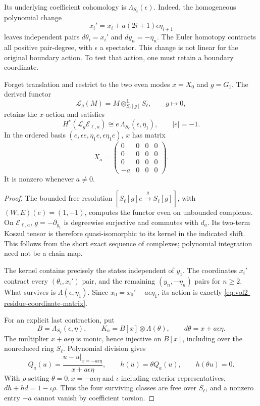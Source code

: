 Its underlying coefficient cohomology is
\(\Lambda_{S_\ell}(\epsilon)\). Indeed, the homogeneous
polynomial change
\[
 x_i'=x_i+a(2i+1)\epsilon\eta_{i+1}
\]
leaves independent pairs \(d\theta_i=x_i'\) and
\(dy_n=-\eta_n\). The Euler homotopy contracts all positive
pair-degree, with \(\epsilon\) a spectator.
This change is not linear for the original boundary action.
To test that action, one must retain a boundary coordinate.

\begin{proposition}\label{prop:vol2-residue-derived-detector}
Forget translation and restrict to the two even modes
\(x=X_0\) and \(g=G_1\). The derived functor
\[
 \mathcal L_g(M)
   =M\otimes^{\mathbb L}_{S_\ell[g]}S_\ell,\qquad g\mapsto0,
\]
retains the \(x\)-action and satisfies
\[
 H^*(\mathcal L_g\mathcal E_{\ell,a})
       \cong e\,\Lambda_{S_\ell}(\epsilon,\eta_1),
 \qquad |e|=-1.
\]
In the ordered basis
\((e,\epsilon e,\eta_1e,\epsilon\eta_1e)\), \(x\) has matrix
\begin{equation}\label{eq:vol2-residue-coordinate-matrix}
 X_a=
 \begin{pmatrix}
 0&0&0&0\\
 0&0&0&0\\
 0&0&0&0\\
 -a&0&0&0
 \end{pmatrix}.
\end{equation}
It is nonzero whenever \(a\ne0\).
\end{proposition}
\begin{proof}
The bounded free resolution
\([S_\ell[g]e\xrightarrow{g}S_\ell[g]]\), with
\((W,E)(e)=(1,-1)\), computes the functor even on
unbounded complexes. On \(\mathcal E_{\ell,a}\),
\(g=-\partial_{y_1}\) is degreewise surjective and commutes
with \(d_a\). Its two-term Koszul tensor is therefore
quasi-isomorphic to its kernel in the indicated shift.
This follows from the short exact sequence of complexes;
polynomial integration need not be a chain map.

The kernel contains precisely the states independent of
\(y_1\). The coordinates \(x_i'\) contract every
\((\theta_i,x_i')\) pair, and the remaining
\((y_n,-\eta_n)\) pairs for \(n\ge2\). What survives is
\(\Lambda(\epsilon,\eta_1)\). Since
\(x_0=x_0'-a\epsilon\eta_1\), its action is exactly
\eqref{eq:vol2-residue-coordinate-matrix}.

For an explicit last contraction, put
\[
 B=\Lambda_{S_\ell}(\epsilon,\eta),\qquad
 K_a=B[x]\otimes\Lambda(\theta),\qquad
 d\theta=x+a\epsilon\eta.
\]
The multiplier \(x+a\epsilon\eta\) is monic, hence injective
on \(B[x]\), including over the nonreduced ring \(S_\ell\).
Polynomial division gives
\[
 Q_a(u)=\frac{u-u|_{x=-a\epsilon\eta}}{x+a\epsilon\eta},
 \qquad h(u)=\theta Q_a(u),\qquad h(\theta u)=0.
\]
With \(\rho\) setting \(\theta=0,x=-a\epsilon\eta\) and
\(\iota\) including exterior representatives,
\(dh+hd=1-\iota\rho\). Thus the four surviving classes are
free over \(S_\ell\), and a nonzero entry \(-a\) cannot
vanish by coefficient torsion.
\end{proof}

